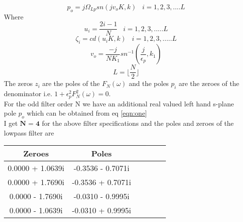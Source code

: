 \documentclass[12pt]{article}
\begin{document}
\begin{equation*}
    p_o = j\Omega_{Lp}sn(jv_oK,k) \; \; \; i = 1,2,3,....L
\end{equation*}
Where 
\begin{equation*}
    u_i = \frac{2i-1}{N} \; \; \; i = 1,2,3,.....L
\end{equation*}
\begin{equation*}
    \zeta_i = cd(u_iK, k)\; \; \;i = 1, 2,3,.....L
\end{equation*}
\begin{equation*}
    v_o = \frac{-j}{NK_1}sn^{-1}(\frac{j}{\epsilon_p},k_1)
\end{equation*}
\begin{equation*}
    L = \lfloor \frac{N}{2} \rfloor
\end{equation*}
The zeros $z_i$ are the poles of the $F_N(\omega)$ and the poles $p_i$ are the zeroes of the denominator i.e. $1+\epsilon_p^2F_N^2(\omega)=0$.\\
For the odd filter order N we have an additional real valued left hand s-plane pole $p_o$ which can be obtained from eq \ref{eqn:one}\\
I get $\textbf{N = 4 }$for the above filter specifications and the poles and zeroes of the lowpass filter are\\

\begin{table}[!hbt]
		\begin{center}
		\begin{tabular}{|c|c|c|c|c|c|}
			\hline
			  Zeroes & Poles \\
			\hline
			0.0000 + 1.0639i &  -0.3536 - 0.7071i\\
			\hline
			 0.0000 + 1.7690i &  -0.3536 + 0.7071i\\
			\hline
			0.0000 - 1.7690i  &  -0.0310 - 0.9995i\\
			\hline
		    	0.0000 - 1.0639i  &  -0.0310 + 0.9995i\\
			\hline
		    
		\end{tabular}
		\end{center}
\end{table}
\end{document}
